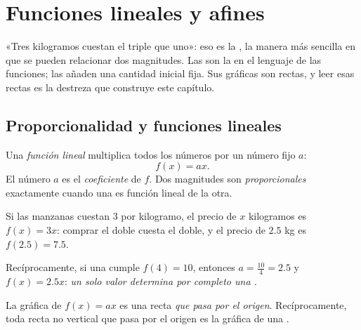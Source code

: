 \chapter{Funciones lineales y afines}\label{ch:g9:linfunc}

«Tres kilogramos cuestan el triple que uno»: eso es la
, la manera más sencilla en que se pueden relacionar dos magnitudes. Las  son la  en el lenguaje de las funciones; las  añaden una cantidad inicial fija. Sus gráficas son rectas,
y leer esas rectas es la destreza que construye este capítulo.

\section{Proporcionalidad y funciones lineales}

\begin{definition}\label{def:g9:linfunc:linear}
Una \emph{función lineal} multiplica todos los números
por un número fijo $a$:
\[
f(x) = a x .
\]
El número $a$ es el \emph{coeficiente} de $f$. Dos magnitudes son
\emph{proporcionales} exactamente cuando una es función
lineal de la otra.
\end{definition}

\begin{example}\label{ex:g9:linfunc:linear}
Si las manzanas cuestan $3$ por kilogramo, el precio de $x$ kilogramos es
$f(x) = 3x$: comprar el doble cuesta el doble, y el precio de
$2.5$ kg es $f(2.5) = 7.5$.

Recíprocamente, si una  cumple $f(4) = 10$, entonces
$a = \frac{10}{4} = 2.5$ y $f(x) = 2.5x$: \emph{un solo valor determina por completo
una .}
\end{example}

\begin{proposition}\label{prop:g9:linfunc:lineargraph}
La gráfica de $f(x) = ax$ es una recta \emph{que pasa por el origen}.
Recíprocamente, toda recta no vertical que pasa por el origen es la gráfica de una
.
\end{proposition}
\admitted

